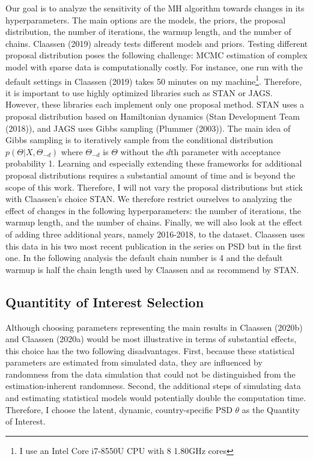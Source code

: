 \documentclass[12pt,english,a4paper,oneside]{article}
\theoremstyle{definition}
\theoremstyle{definition}
\theoremstyle{definition}
\theoremstyle{definition}
\theoremstyle{remark}
\begin{document}
Our goal is to analyze the sensitivity of the MH algorithm towards changes in its hyperparameters. The main options are the models, the priors, the proposal distribution, the number of iterations, the warmup length, and the number of chains. Claassen (2019) already tests different models and priors. Testing different proposal distribution poses the following challenge: MCMC estimation of complex model with sparse data is computationally costly. For instance, one run with the default settings in Claassen (2019) takes 50 minutes on my machine\footnote{I use an Intel Core i7-8550U CPU with 8 1.80GHz cores}. Therefore, it is important to use highly optimized libraries such as STAN or JAGS. However, these libraries each implement only one proposal method. STAN uses a proposal distribution based on Hamiltonian dynamics (Stan Development Team (2018)), and JAGS uses Gibbs sampling (Plummer (2003)). The main idea of Gibbs sampling is to iteratively sample from the conditional distribution \(p(\Theta|X, \Theta_{-d})\) where \(\Theta_{-d}\) is \(\Theta\) without the \(d\)th parameter with acceptance probability 1. Learning and especially extending these frameworks for additional proposal distributions requires a substantial amount of time and is beyond the scope of this work. Therefore, I will not vary the proposal distributions but stick with Claassen's choice STAN. We therefore restrict ourselves to analyzing the effect of changes in the following hyperparameters: the number of iterations, the warmup length, and the number of chains. Finally, we will also look at the effect of adding three additional years, namely 2016-2018, to the dataset. Claassen uses this data in his two most recent publication in the series on PSD but in the first one. In the following analysis the default chain number is 4 and the default warmup is half the chain length used by Claassen and as recommend by STAN.

\hypertarget{quantitity-of-interest-selection}{%
\subsection{Quantitity of Interest Selection}\label{quantitity-of-interest-selection}}

Although choosing parameters representing the main results in Claassen (2020b) and Claassen (2020a) would be most illustrative in terms of substantial effects, this choice has the two following disadvantages. First, because these statistical parameters are estimated from simulated data, they are influenced by randomness from the data simulation that could not be distinguished from the estimation-inherent randomness. Second, the additional steps of simulating data and estimating statistical models would potentially double the computation time. Therefore, I choose the latent, dynamic, country-specific PSD \(\theta\) as the Quantity of Interest.
\end{document}
